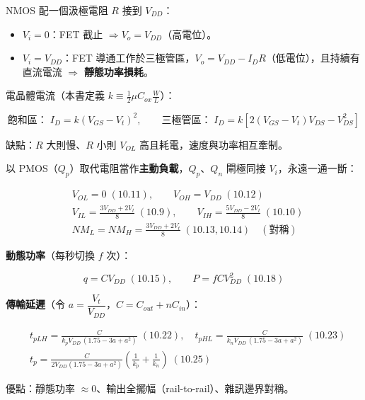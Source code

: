 \documentclass[12pt]{article}
\begin{document}
\begin{keybox}
NMOS 配一個汲極電阻 $R$ 接到 $V_{DD}$：
\begin{itemize}[leftmargin=2.2em,itemsep=1pt]
  \item $V_i=0$：FET 截止 $\Rightarrow V_o=V_{DD}$（高電位）。
  \item $V_i=V_{DD}$：FET 導通工作於三極管區，$V_o=V_{DD}-I_DR$（低電位），且持續有直流電流 $\Rightarrow$ \textbf{靜態功率損耗}。
\end{itemize}
電晶體電流（本書定義 $k\equiv\tfrac{1}{2}\mu C_{ox}\tfrac{W}{L}$）：
\begin{formulabox}
\[ \text{飽和區：}\;I_D=k(V_{GS}-V_t)^2,\qquad
   \text{三極管區：}\;I_D=k\!\left[2(V_{GS}-V_t)V_{DS}-V_{DS}^2\right] \]
\end{formulabox}
缺點：$R$ 大則慢、$R$ 小則 $V_{OL}$ 高且耗電，速度與功率相互牽制。
\end{keybox}

\begin{keybox}
以 PMOS（$Q_p$）取代電阻當作\textbf{主動負載}，$Q_p$、$Q_n$ 閘極同接 $V_i$，永遠一通一斷：
\begin{formulabox}
\begin{align*}
&V_{OL}=0 \;(10.11),\qquad V_{OH}=V_{DD}\;(10.12)\\
&V_{IL}=\frac{3V_{DD}+2V_t}{8}\;(10.9),\qquad V_{IH}=\frac{5V_{DD}-2V_t}{8}\;(10.10)\\
&NM_L=NM_H=\frac{3V_{DD}+2V_t}{8}\;(10.13,10.14)\quad(\text{對稱})
\end{align*}
\end{formulabox}
\textbf{動態功率}（每秒切換 $f$ 次）：
\begin{formulabox}
\[ q=CV_{DD}\;(10.15),\qquad P=fCV_{DD}^2\;(10.18) \]
\end{formulabox}
\textbf{傳輸延遲}（令 $a=\dfrac{V_t}{V_{DD}}$，$C=C_{out}+nC_{in}$）：
\begin{formulabox}
\begin{align*}
&t_{pLH}=\frac{C}{k_pV_{DD}\,(1.75-3a+a^2)}\;(10.22),\quad
 t_{pHL}=\frac{C}{k_nV_{DD}\,(1.75-3a+a^2)}\;(10.23)\\
&t_p=\frac{C}{2V_{DD}(1.75-3a+a^2)}\left(\frac{1}{k_p}+\frac{1}{k_n}\right)\;(10.25)
\end{align*}
\end{formulabox}
優點：靜態功率 $\approx 0$、輸出全擺幅（rail-to-rail）、雜訊邊界對稱。
\end{keybox}
\end{document}
